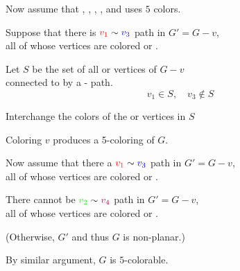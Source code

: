 \begin{frame}{}
  \begin{center}
    Now assume that , , ,
    , and  uses $5$ colors.

    \pause
    \vspace{0.30cm}
    Suppose that there is  $\textcolor{red}{v_{1}} \sim \textcolor{blue}{v_{3}}$ path in $G' = G - v$, \\
    all of whose vertices are colored  or .

    \pause
    \vspace{0.30cm}
    Let $S$ be the set of all  or  vertices of $G - v$ \\
    connected to  by a - path.
    \pause
    \[
      v_{1} \in S,\quad v_{3} \notin S
    \]

    \pause
    Interchange the colors of the  or  vertices in $S$

    \pause
    \vspace{0.30cm}
    Coloring $v$  produces a 5-coloring of $G$.
  \end{center}
\end{frame}

\begin{frame}{}
  \begin{center}
    Now assume that there  a $\textcolor{red}{v_{1}} \sim \textcolor{blue}{v_{3}}$ path in $G' = G - v$, \\
    all of whose vertices are colored  or .

    \pause
    \vspace{0.30cm}
    There cannot be $\textcolor{green}{v_{2}} \sim \textcolor{purple}{v_{4}}$ path in $G' = G - v$, \\
    all of whose vertices are colored  or .

    \pause
    \vspace{0.20cm}
    (Otherwise, $G'$ and thus $G$ is non-planar.)

    \pause
    \vspace{0.50cm}
    By similar argument, $G$ is $5$-colorable.
  \end{center}
\end{frame}

